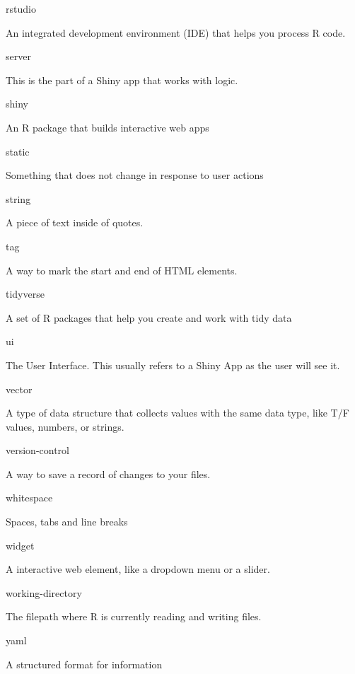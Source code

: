 \documentclass[
  oneside]{book}
\begin{document}
rstudio

An integrated development environment (IDE) that helps you process R code.

server

This is the part of a Shiny app that works with logic.

shiny

An R package that builds interactive web apps

static

Something that does not change in response to user actions

string

A piece of text inside of quotes.

tag

A way to mark the start and end of HTML elements.

tidyverse

A set of R packages that help you create and work with tidy data

ui

The User Interface. This usually refers to a Shiny App as the user will see it.

vector

A type of data structure that collects values with the same data type, like T/F values, numbers, or strings.

version-control

A way to save a record of changes to your files.

whitespace

Spaces, tabs and line breaks

widget

A interactive web element, like a dropdown menu or a slider.

working-directory

The filepath where R is currently reading and writing files.

yaml

A structured format for information

  
\end{document}
